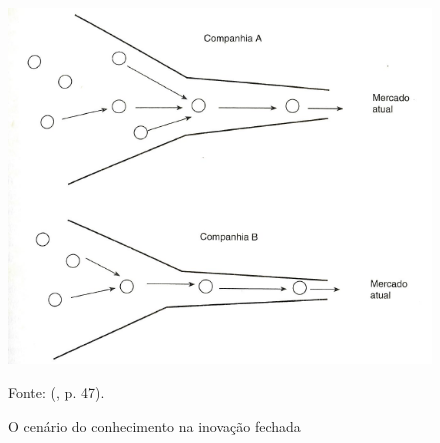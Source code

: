 \begin{figure}[H]
    \caption{O cenário do conhecimento na inovação fechada}
    \centering
    \includegraphics[width=\linewidth]{images/fundamentacao/inovacaofechadachesbrough.png}
    \label{fig:inovacaofechada}
    
    Fonte: \citeauthor{chesbrough2003} (\citeyear{chesbrough2003}, p. 47).
\end{figure}